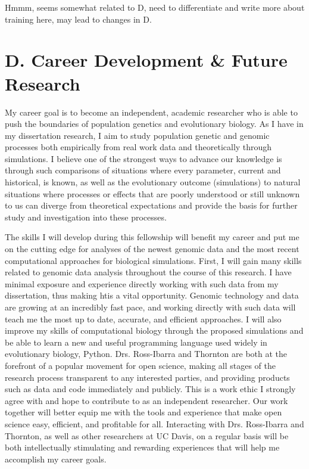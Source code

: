 Hmmm, seems somewhat related to D, need to differentiate and write more about training here, may lead to changes in D.

\section*{D. Career Development \& Future Research}

My career goal is to become an independent, academic researcher who is able to push the boundaries of population genetics and evolutionary biology. As I have in my dissertation research, I aim to study population genetic and genomic processes both empirically from real work data and theoretically through simulations. I believe one of the strongest ways to advance our knowledge is through such comparisons of situations where every parameter, current and historical, is known, as well as the evolutionary outcome (simulations) to natural situations where processes or effects that are poorly understood or still unknown to us can diverge from theoretical expectations and provide the basis for further study and investigation into these processes.

The skills I will develop during this fellowship will benefit my career and put me on the cutting edge for analyses of the newest genomic data and the most recent computational approaches for biological simulations. First, I will gain many skills related to genomic data analysis throughout the course of this research. I have minimal exposure and experience directly working with such data from my dissertation, thus making htis a vital opportunity. Genomic technology and data are growing at an incredibly fast pace, and working directly with such data will teach me the most up to date, accurate, and efficient approaches. I will also improve my skills of computational biology through the proposed simulations and be able to learn a new and useful programming language used widely in evolutionary biology, Python. Drs. Ross\--Ibarra and Thornton are both at the forefront of a popular  movement for open science, making all stages of the research process transparent to any interested parties, and providing products such as data and code immediately and publicly. This is a work ethic I strongly agree with and hope to contribute to as an independent researcher. Our work together will better equip me with the tools and experience that make open science easy, efficient, and profitable for all. Interacting with Drs. Ross\--Ibarra and Thornton, as well as other researchers at UC Davis, on a regular basis will be both intellectually stimulating and rewarding experiences that will help me accomplish my career goals.


